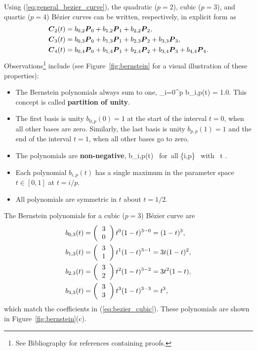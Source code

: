 Using (\ref{eq:general_bezier_curve}),
the quadratic ($p=2$), cubic ($p=3$), and quartic ($p=4$) B\'ezier curves
can be written, respectively, in explicit form as 
\begin{align}
\mbox{\boldmath $C$}_2(t) 
&=
b_{0,2} \mbox{\boldmath $P$}_0 + b_{1,2} \mbox{\boldmath $P$}_1 + b_{2,2} \mbox{\boldmath $P$}_2, \\
\mbox{\boldmath $C$}_3(t) 
&=
b_{0,3} \mbox{\boldmath $P$}_0 + b_{1,3} \mbox{\boldmath $P$}_1 + b_{2,3} \mbox{\boldmath $P$}_2 + b_{3,3} \mbox{\boldmath $P$}_3, \\
\mbox{\boldmath $C$}_4(t) 
&=
b_{0,4} \mbox{\boldmath $P$}_0 + b_{1,4} \mbox{\boldmath $P$}_1 + b_{2,4} \mbox{\boldmath $P$}_2 + b_{3,4} \mbox{\boldmath $P$}_3 + b_{4,4} \mbox{\boldmath $P$}_4.
\end{align}
Observations\footnote{See Bibliography for references containing 
proofs.} include (see Figure~\ref{fig:bernstein} for a visual illustration of these 
properties):
\begin{itemize}
\item The Bernstein polynomials always sum to one, 
\be
\sum_{i=0}^p b_{i,p}(t) = 1.0.
\ee
This concept is called {\bf partition of unity}.  
\item The first basis is unity $b_{0,p}(0) = 1$ at the start of the interval $t=0$,
when all other bases are zero.  Similarly, the last basis is unity  
$b_{p,p}(1) = 1$ and the end of the interval $t=1$, when all other bases go to zero.
\item The polynomials are {\bf non-negative},
\be
b_{i,p}(t)  \mbox{ for all} \left\{i,p\right\} \mbox{ with } t \in [0, 1].
\ee
\item Each polynomial $b_{i,p}(t)$ has a single maximum in the parameter space 
$t \in [0,1]$ at $t=i/p$.  
\item All polynomials are symmetric in $t$ about $t=1/2$.
\end{itemize}


\clearpage
\begin{Hexpo}
{The Bernstein polynomials for a cubic ($p=3$) B\'ezier curve are
\begin{align}
b_{0,3}(t) & = \left(\begin{tabular}{c} 3 \\ 0 \end{tabular} \right) 
t^0 (1-t)^{3-0} = (1 - t)^3,
\\
%
b_{1,3}(t) & = \left(\begin{tabular}{c} 3 \\ 1 \end{tabular} \right) 
t^1 (1-t)^{3-1} = 3t (1 - t)^2,
\\
%
b_{2,3}(t) & = \left(\begin{tabular}{c} 3 \\ 2 \end{tabular} \right) 
t^2 (1-t)^{3-2} = 3 t^2 (1 - t),
\\
%
b_{3,3}(t) & = \left(\begin{tabular}{c} 3 \\ 3 \end{tabular} \right) 
t^3 (1-t)^{3-3} = t^3,
%
\end{align}
which match the coefficients in (\ref{eq:bezier_cubic}).  
These polynomials are shown in Figure~\ref{fig:bernstein}(c).
} %
\end{Hexpo}

